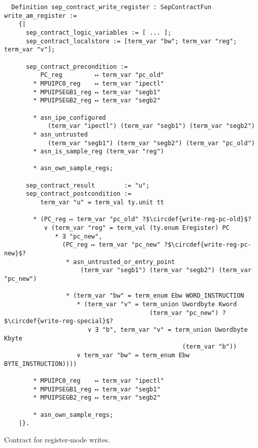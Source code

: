 \begin{listing}
  \startcstep
  \begin{verbatim}
  Definition sep_contract_write_register : SepContractFun write_am_register :=
    {|
      sep_contract_logic_variables := [ ... ];
      sep_contract_localstore := [term_var "bw"; term_var "reg"; term_var "v"];

      sep_contract_precondition :=
          PC_reg         ↦ term_var "pc_old"
        * MPUIPC0_reg    ↦ term_var "ipectl"
        * MPUIPSEGB1_reg ↦ term_var "segb1"
        * MPUIPSEGB2_reg ↦ term_var "segb2"

        * asn_ipe_configured
            (term_var "ipectl") (term_var "segb1") (term_var "segb2")
        * asn_untrusted
            (term_var "segb1") (term_var "segb2") (term_var "pc_old")
        * asn_is_sample_reg (term_var "reg")

        * asn_own_sample_regs;

      sep_contract_result        := "u";
      sep_contract_postcondition :=
          term_var "u" = term_val ty.unit tt

        * (PC_reg ↦ term_var "pc_old" ?$\circdef{write-reg-pc-old}$?
           ∨ (term_var "reg" = term_val (ty.enum Eregister) PC
              * ∃ "pc_new",
                (PC_reg ↦ term_var "pc_new" ?$\circdef{write-reg-pc-new}$?
                 * asn_untrusted_or_entry_point
                     (term_var "segb1") (term_var "segb2") (term_var "pc_new")

                 * (term_var "bw" = term_enum Ebw WORD_INSTRUCTION
                    * (term_var "v" = term_union Uwordbyte Kword
                                        (term_var "pc_new") ?$\circdef{write-reg-special}$?
                       ∨ ∃ "b", term_var "v" = term_union Uwordbyte Kbyte
                                                 (term_var "b"))
                    ∨ term_var "bw" = term_enum Ebw BYTE_INSTRUCTION))))

        * MPUIPC0_reg    ↦ term_var "ipectl"
        * MPUIPSEGB1_reg ↦ term_var "segb1"
        * MPUIPSEGB2_reg ↦ term_var "segb2"

        * asn_own_sample_regs;
    |}.
  \end{verbatim}
  \caption{Contract for register-mode writes.}
  \label{lst:write_register}
\end{listing}


